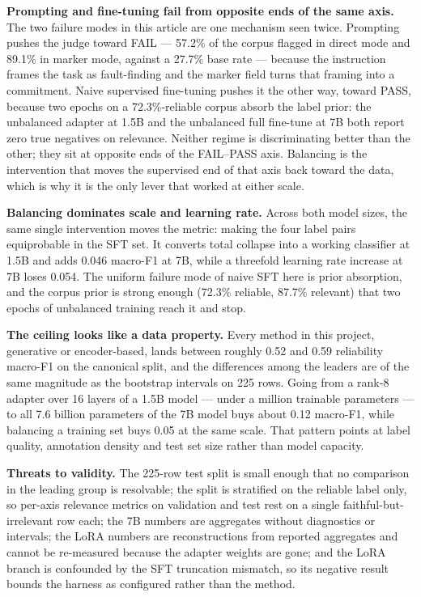 \documentclass{zapiski}
\begin{document}
\textbf{Prompting and fine-tuning fail from opposite ends of the same axis.}
The two failure modes in this article are one mechanism seen twice. Prompting
pushes the judge toward FAIL --- 57.2\% of the corpus flagged in direct mode
and 89.1\% in marker mode, against a 27.7\% base rate --- because the
instruction frames the task as fault-finding and the marker field turns that
framing into a commitment. Naive supervised fine-tuning pushes it the other
way, toward PASS, because two epochs on a 72.3\%-reliable corpus absorb the
label prior: the unbalanced adapter at 1.5B and the unbalanced full
fine-tune at 7B both report zero true negatives on relevance. Neither regime
is discriminating better than the other; they sit at opposite ends of the
FAIL--PASS axis. Balancing is the intervention that moves the supervised end
of that axis back toward the data, which is why it is the only lever that
worked at either scale.

\textbf{Balancing dominates scale and learning rate.} Across both model sizes,
the same single intervention moves the metric: making the four label pairs
equiprobable in the SFT set. It converts total collapse into a working
classifier at 1.5B and adds 0.046 macro-F1 at 7B, while a threefold learning
rate increase at 7B loses 0.054. The uniform failure mode of naive SFT here is
prior absorption, and the corpus prior is strong enough (72.3\% reliable,
87.7\% relevant) that two epochs of unbalanced training reach it and stop.

\textbf{The ceiling looks like a data property.} Every method in this
project, generative or encoder-based, lands between roughly 0.52 and 0.59
reliability macro-F1 on the canonical split, and the differences among the
leaders are of the same magnitude as the bootstrap intervals on 225 rows.
Going from a rank-8 adapter over 16 layers of a 1.5B model --- under a million
trainable parameters --- to all 7.6 billion parameters of the 7B model buys
about 0.12 macro-F1, while balancing a training set buys 0.05 at the same
scale. That pattern points at label quality, annotation density and test set
size rather than model capacity.

\textbf{Threats to validity.} The 225-row test split is small enough that no
comparison in the leading group is resolvable; the split is stratified on the
reliable label only, so per-axis relevance metrics on validation and test rest
on a single faithful-but-irrelevant row each; the 7B numbers are aggregates
without diagnostics or intervals; the LoRA numbers are reconstructions from
reported aggregates and cannot be re-measured because the adapter weights are
gone; and the LoRA branch is confounded by the SFT truncation mismatch, so its
negative result bounds the harness as configured rather than the method.
\end{document}
